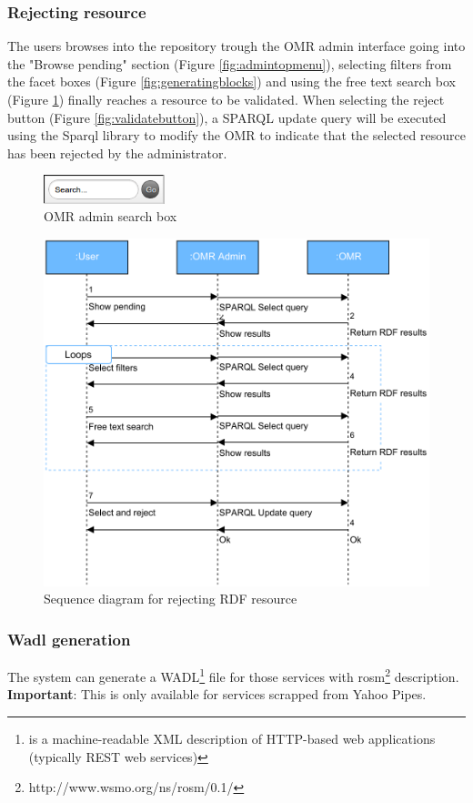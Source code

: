 \subsubsection{Rejecting resource}
The users browses into the repository trough the OMR admin interface going into the "Browse pending" section (Figure \ref{fig:admintopmenu}), selecting filters from the facet boxes (Figure \ref{fig:generatingblocks}) and using the free text search box (Figure \ref{fig:searchboxadmin}) finally reaches a resource to be validated. When selecting the reject button (Figure \ref{fig:validatebutton}), a SPARQL update query will be executed using the Sparql library to modify the OMR to indicate that the selected resource has been rejected by the administrator.

\begin{figure}[h]
	\centering
	\includegraphics[width=100pt]{graphics/omr-search-box.png}
	\caption{OMR admin search box}
	\label{fig:searchboxadmin}
\end{figure}

\begin{figure}[h]
	\centering
	\includegraphics[width=350pt]{graphics/Diagrama_secuencia_rechazar.pdf}
	\caption{Sequence diagram for rejecting RDF resource}
	\label{fig:rejectsequence}
\end{figure}

\newpage
\subsubsection{Wadl generation}
The system can generate a WADL\footnote{ is a machine-readable XML description of HTTP-based web applications (typically REST web services)} file for those services with rosm\footnote{http://www.wsmo.org/ns/rosm/0.1/} description.
\textbf{Important}: This is only available for services scrapped from Yahoo Pipes.


